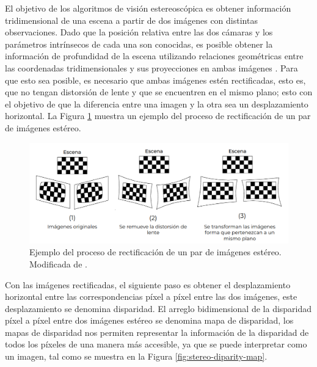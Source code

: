 El objetivo de los algoritmos de visión estereoscópica es obtener información tridimensional de una escena a partir de dos imágenes con distintas observaciones. Dado que la posición relativa entre las dos cámaras y los parámetros intrínsecos de cada una son conocidas, es posible obtener la información de profundidad de la escena utilizando relaciones geométricas entre las coordenadas tridimensionales y sus proyecciones en ambas imágenes \cite{sterovis}. Para que esto sea posible, es necesario que ambas imágenes estén rectificadas, esto es, que no tengan distorsión de lente y que se encuentren en el mismo plano; esto con el objetivo de que la diferencia entre una imagen y la otra sea un desplazamiento horizontal. La Figura \ref{fig:stereo-rectification} muestra un ejemplo del proceso de rectificación de un par de imágenes estéreo.

\begin{figure}[H]
    \centering
    \includegraphics[scale=0.4]{partes/img/rectificacion.png}
    \caption[Ejemplo del proceso de rectificación de un par de imágenes estéreo.]{Ejemplo del proceso de rectificación de un par de imágenes estéreo. Modificada de \cite{Alberto2010}.}
    \label{fig:stereo-rectification}
\end{figure}

Con las imágenes rectificadas, el siguiente paso es obtener el desplazamiento horizontal entre las correspondencias píxel a píxel entre las dos imágenes, este desplazamiento se denomina disparidad. El arreglo bidimensional de la disparidad píxel a píxel entre dos imágenes estéreo se denomina mapa de disparidad, los mapas de disparidad nos permiten representar la información de la disparidad de todos los píxeles de una manera más accesible, ya que se puede interpretar como un imagen, tal como se muestra en la Figura \ref{fig:stereo-diparity-map}.

